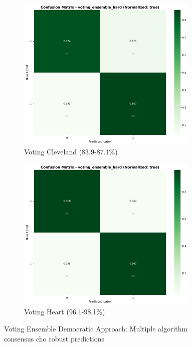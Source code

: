 \begin{figure}[H]
\centering
\begin{subfigure}[b]{0.48\textwidth}
\centering
\includegraphics[width=0.95\textwidth]{Result/cleveland_dataset/confusion_matrices/voting_ensemble_hard_numeric_dataset_StandardScaler.png}
\caption{Voting Cleveland (83.9-87.1\%)}
\label{fig:voting_cleveland_performance}
\end{subfigure}
\hfill
\begin{subfigure}[b]{0.48\textwidth}
\centering
\includegraphics[width=0.95\textwidth]{Result/heart_dataset/confusion_matrices/voting_ensemble_hard_numeric_dataset_StandardScaler.png}
\caption{Voting Heart (96.1-98.1\%)}
\label{fig:voting_heart_performance}
\end{subfigure}
\caption{Voting Ensemble Democratic Approach: Multiple algorithm consensus cho robust predictions}
\label{fig:voting_analysis_complete}


\end{figure}

